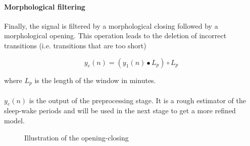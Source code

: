 \documentclass[a4paper,12pt]{article}
\begin{document}
\paragraph{Morphological filtering}
\label{closing-opening}
Finally, the signal is filtered by a morphological closing followed by a morphological opening. This operation leads to the deletion of incorrect transitions (i.e. transitions that are too short)

\begin{equation}
y_e(n) = (y_1(n) \bullet L_p) \circ L_p
\end{equation}

where $L_p$ is the length of the window in minutes.

\paragraph{}
$y_e(n)$ is the output of the preprocessing stage. It is a rough estimator of the sleep-wake periods and will be used in the next stage to get a more refined model.

\begin{figure}[H]
\centering
{}
\caption{Illustration of the opening-closing}
\end{figure}
\end{document}
